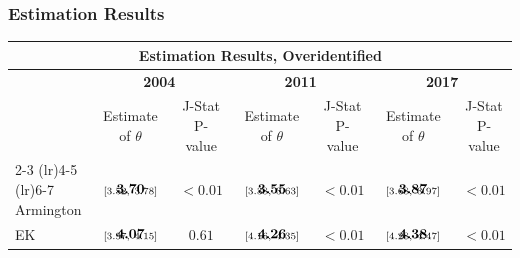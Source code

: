 \documentclass[10pt,pdftex,aspectratio=1610]{beamer}
\theoremstyle{definition}
\begin{document}
\begin{frame}[t]
\frametitle{Estimation Results}
\footnotesize

\begin{table}[!t]
\footnotesize
\renewcommand{\arraystretch}{1.85}
\setlength {\tabcolsep}{1.75mm}
\begin{center}\label{tb:data_rslts}
\begin{tabular}[t]{l c c c c c c }
\multicolumn{7}{c}{\normalsize \textbf{ Estimation Results, Overidentified}}
\\
\hline
\hline
& \multicolumn{2}{c}{\textbf{2004}} & \multicolumn{2}{c}{\textbf{2011}} & \multicolumn{2}{c}{\textbf{2017}} \\
& Estimate of $\theta$ & J-Stat P-value & Estimate of $\theta$ & J-Stat P-value & Estimate of $\theta$ & J-Stat P-value \\
\cmidrule(r){2-3}  \cmidrule(lr){4-5} \cmidrule(lr){6-7}
Armington       & $\begin{array}{c}{\textbf{3.70}} \vspace{-.4cm}\\ \scriptstyle{[3.52,   \ 3.78]}\end{array}$ & $< 0.01$&
$\begin{array}{c}{\textbf{3.55}} \vspace{-.4cm}\\ \scriptstyle{[3.38,   \ 3.63]}\end{array}$ & $< 0.01$&
$\begin{array}{c}{\textbf{3.87}} \vspace{-.4cm}\\ \scriptstyle{[3.68,   \ 3.97]}\end{array}$ &$< 0.01$\\
EK              & $\begin{array}{c}{\textbf{4.07}} \vspace{-.4cm}\\ \scriptstyle{[3.97,   \ 4.15]}\end{array}$  & $0.61$&
$\begin{array}{c}{\textbf{4.26}} \vspace{-.4cm}\\ \scriptstyle{[4.16,   \ 4.35]}\end{array}$ & $< 0.01$&
$\begin{array}{c}{\textbf{4.38}} \vspace{-.4cm}\\ \scriptstyle{[4.28,   \ 4.47]}\end{array}$ & $< 0.01$\\

\end{tabular}
\end{center}
\end{table}
\end{frame}
\end{document}
